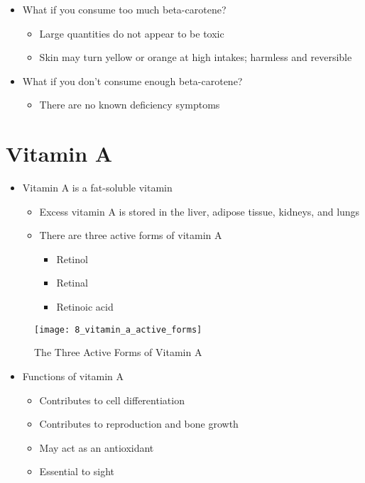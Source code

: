 \documentclass[title={Chapter 8}]{fdsn201notes}
\begin{document}
\begin{itemize}
	\item What if you consume too much beta-carotene?
	\begin{itemize}
		\item Large quantities do not appear to be toxic
		\item Skin may turn yellow or orange at high intakes; harmless and reversible
	\end{itemize}
	\item What if you don’t consume enough beta-carotene?
	\begin{itemize}
		\item There are no known deficiency symptoms
	\end{itemize}
\end{itemize}

\section{Vitamin A}\label{sec:Vitamin A}
\begin{itemize}
	\item Vitamin A is a fat-soluble vitamin
	\begin{itemize}
		\item Excess vitamin A is stored in the liver, adipose tissue, kidneys, and lungs
		\item There are three active forms of vitamin A
		\begin{itemize}
			\item Retinol
			\item Retinal
			\item Retinoic acid
		\end{itemize}
	\end{itemize}
\end{itemize}

\begin{figure}[H]
	\centering
	\texttt{[image: 8\_vitamin\_a\_active\_forms]}
	\caption{The Three Active Forms of Vitamin A}
	\label{fig:vitamin-a-active-forms}
\end{figure}

\begin{itemize}
	\item Functions of vitamin A
	\begin{itemize}
		\item Contributes to cell differentiation
		\item Contributes to reproduction and bone growth
		\item May act as an antioxidant
		\item Essential to sight
	\end{itemize}
\end{itemize}
\end{document}
